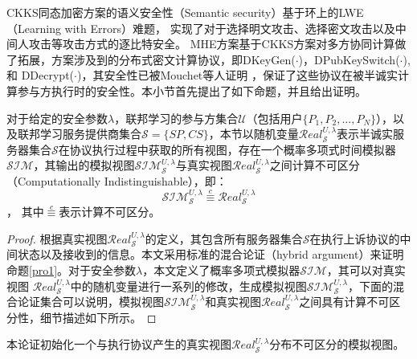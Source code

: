 CKKS同态加密方案的语义安全性（Semantic security）基于环上的LWE（Learning with Errors）难题，
实现了对于选择明文攻击、选择密文攻击以及中间人攻击等攻击方式的逐比特安全\cite{cheon2017homomorphic, lindner2011better, lyubashevsky2010ideal}。
MHE方案基于CKKS方案对多方协同计算做了拓展，方案涉及到的分布式密文计算协议，即DKeyGen($\cdot$)，DPubKeySwitch($\cdot$), 和 DDecrypt($\cdot$)，其安全性已被Mouchet等人证明 \cite{mouchet2020multiparty}，保证了这些协议在被半诚实计算参与方执行时的安全性。本小节首先提出了如下命题，并且给出证明。
\begin{proposition}[对半诚实服务器的安全性]\label{pro1}
	对于给定的安全参数$ \lambda $，联邦学习的参与方集合$\mathcal{U}$（包括用户$\{P_1, P_2,...,P_N\}$），以及联邦学习服务提供商集合$\mathcal{S} = \{SP, CS\}$，本节以随机变量$\mathcal{R} e a l_{\mathcal{S}}^{U, \lambda}$表示半诚实服务器集合$\mathcal{S}$在协议执行过程中获取的所有视图，存在一个概率多项式时间模拟器$\mathcal{SIM}$，其输出的模拟视图$ \mathcal{S I} \mathcal{M}_{\mathcal{S}}^{U, \lambda} $与真实视图$\mathcal{R} e a l_{\mathcal{S}}^{U, \lambda}$之间计算不可区分（Computationally Indistinguishable），即：
	$$
		\mathcal{S I} \mathcal{M}_{\mathcal{S}}^{U, \lambda} \stackrel{c}{\equiv} \mathcal{R} e a l_{\mathcal{S}}^{U, \lambda}
	$$，
	其中$\mathop{\equiv}\limits^{c}$表示计算不可区分。
\end{proposition}

\begin{proof}
	根据真实视图$\mathcal{R} e a l_{\mathcal{S}}^{U, \lambda}$的定义，其包含所有服务器集合$\mathcal{S}$在执行上诉协议的中间状态以及接收到的信息。本文采用标准的混合论证（hybrid argument）\cite{bonawitz2017practical, xu2020privacy}来证明命题\ref{pro1}。对于安全参数$ \lambda $，本文定义了概率多项式模拟器$\mathcal{SIM}$，其可以对真实视图 $\mathcal{R} e a l_{\mathcal{S}}^{U, \lambda}$中的随机变量进行一系列的修改，生成模拟视图$ \mathcal{S I} \mathcal{M}_{\mathcal{S}}^{U, \lambda} $，下面的混合论证集合可以说明，模拟视图$ \mathcal{S I} \mathcal{M}_{\mathcal{S}}^{U, \lambda} $和真实视图$\mathcal{R} e a l_{\mathcal{S}}^{U, \lambda}$之间具有计算不可区分性，细节描述如下所示。
\end{proof}

\begin{hybrid}\label{h1}
	本论证初始化一个与执行协议产生的真实视图$\mathcal{R} e a l_{\mathcal{S}}^{U, \lambda}$分布不可区分的模拟视图。
\end{hybrid}

